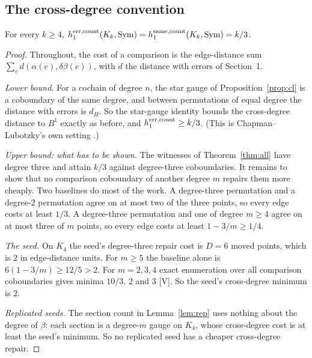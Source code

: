 \documentclass[11pt]{article}
\theoremstyle{remark}\newtheorem{remark}[theorem]{Remark}
\newcommand{\Sym}{\mathrm{Sym}}\newcommand{\dH}{d_H}\newcommand{\F}{\mathbb{F}}\newcommand{\Z}{\mathbb{Z}}
\begin{document}
\subsection{The cross-degree convention}\label{sec:crossdeg}
\begin{proposition}[T+V+C]\label{prop:crossdeg}
For every $k\ge4$, $h_1^{\rm err,count}(K_k,\Sym)=h_1^{\rm same,count}(K_k,\Sym)=k/3$.
\end{proposition}
\begin{proof}
Throughout, the cost of a comparison is the edge-distance sum $\sum_e d(\alpha(e),\delta\beta(e))$, with $d$ the distance with errors of Section~1.

\emph{Lower bound.} For a cochain of degree $n$, the star gauge of Proposition~\ref{prop:cl} is a coboundary of the same degree, and between permutations of equal degree the distance with errors is $\dH$. So the star-gauge identity bounds the cross-degree distance to $B^1$ exactly as before, and $h_1^{\rm err,count}\ge k/3$. (This is Chapman--Lubotzky's own setting \cite{CL1,CL2}.)

\emph{Upper bound: what has to be shown.} The witnesses of Theorem~\ref{thm:all} have degree three and attain $k/3$ against degree-three coboundaries. It remains to show that no comparison coboundary of another degree $m$ repairs them more cheaply. Two baselines do most of the work. A degree-three permutation and a degree-$2$ permutation agree on at most two of the three points, so every edge costs at least $1/3$. A degree-three permutation and one of degree $m\ge4$ agree on at most three of $m$ points, so every edge costs at least $1-3/m\ge1/4$.

\emph{The seed.} On $K_4$ the seed's degree-three repair cost is $D=6$ moved points, which is $2$ in edge-distance units. For $m\ge5$ the baseline alone is $6(1-3/m)\ge12/5>2$. For $m=2,3,4$ exact enumeration over all comparison coboundaries gives minima $10/3$, $2$ and $3$ [V]. So the seed's cross-degree minimum is $2$.

\emph{Replicated seeds.} The section count in Lemma~\ref{lem:rep} uses nothing about the degree of $\beta$: each section is a degree-$m$ gauge on $K_4$, whose cross-degree cost is at least the seed's minimum. So no replicated seed has a cheaper cross-degree repair.


\end{proof}
\end{document}
